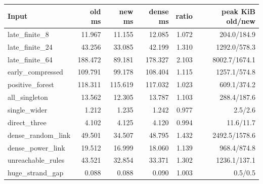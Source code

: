 \begin{center}\small
\begin{tabular}{@{}lrrrrr@{}}
\toprule
Input & old ms & new ms & dense ms & ratio & peak KiB old/new \\
\midrule
late\_finite\_8 & 11.967 & 11.155 & 12.085 & 1.072 & 204.0/184.9 \\
late\_finite\_24 & 43.256 & 33.085 & 42.199 & 1.310 & 1292.0/578.3 \\
late\_finite\_64 & 188.472 & 89.181 & 178.327 & 2.103 & 8002.7/1674.1 \\
early\_compressed & 109.791 & 99.178 & 108.404 & 1.115 & 1257.1/574.8 \\
positive\_forest & 118.311 & 115.619 & 117.032 & 1.023 & 609.1/374.2 \\
all\_singleton & 13.562 & 12.305 & 13.787 & 1.103 & 288.4/187.6 \\
single\_wider & 1.212 & 1.235 & 1.242 & 0.977 & 2.5/2.6 \\
direct\_three & 4.102 & 4.125 & 4.120 & 0.994 & 11.6/11.7 \\
dense\_random\_link & 49.501 & 34.507 & 48.795 & 1.432 & 2492.5/1578.6 \\
dense\_power\_link & 19.512 & 16.999 & 18.060 & 1.139 & 968.4/874.8 \\
unreachable\_rules & 43.521 & 32.854 & 33.371 & 1.302 & 1236.1/137.1 \\
huge\_strand\_gap & 0.088 & 0.088 & 0.090 & 1.003 & 0.5/0.5 \\
\bottomrule
\end{tabular}
\end{center}
